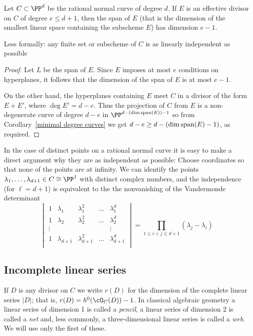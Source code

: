 \begin{corollary}\label{independence of points on a RNC}
Let $C\subset \PP^d$ be the rational normal curve of degree $d$. If $E$ is an effective divisor on $C$ of degree $e\leq d+1$, then the
span of $E$ (that is the dimension of the smallest linear space containing the subscheme $E$) has dimension $e-1$.
\end{corollary}
Less formally: any finite set or subscheme of $C$ is as linearly independent as possible

\begin{proof}
Let $L$ be the span of $E$. Since $E$  imposes at most $e$ conditions on hyperplanes, it follows that the dimension of the span of $E$ is
at most $e-1$.

On the other hand, the hyperplanes containing $E$ meet $C$ in a divisor of the form $E+E'$, where
$\deg E' = d-e$. Thus the projection of $C$ from $E$ is a non-degenerate curve of degree $d-e$ in $\PP^{d-(\dim {\rm span}(E))-1}$
so from Corollary~\ref{minimal degree curves} we get $d-e \geq d-(\dim {\rm span}(E)-1)$, as required.
\end{proof}

In the case of distinct points on a rational normal curve
it is easy to make a direct argument why they are as independent as possible: Choose coordinates so that none of the points are
at infinity. We can identify the points $\lambda_1,\dots,\lambda_{d+1} \in C \cong \PP^1$ with distinct complex numbers, and the independence (for $\ell = d+1$) is equivalent to the the nonvanishing of the Vandermonde determinant
$$
\begin{vmatrix}
1 & \lambda_1 & \lambda_1^2 & \dots & \lambda_1^d \\
1 & \lambda_2 & \lambda_2^2 & \dots & \lambda_2^d \\
\vdots & & & & \vdots \\
1 & \lambda_{d+1} & \lambda_{d+1}^2 & \dots & \lambda_{d+1}^d \\
\end{vmatrix}
= \prod_{1 \leq i < j \leq d+1} (\lambda_j - \lambda_i)
$$


\subsection{Incomplete linear series}

 If $D$ is any divisor on $C$ we write $r(D)$ for the dimension of the complete linear series $|D|$; that is, $r(D) = h^0(\cO_C(D)) - 1$. In classical algebraic geometry a linear series of dimension 1 is called a \emph{pencil}, a linear series of dimension 2 is called a \emph{net} and, less commonly, a three-dimensional linear series is called a \emph{web}.  We will use only the first of these.

